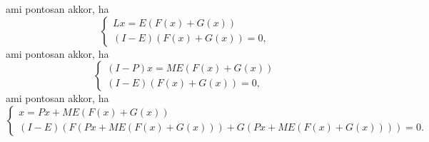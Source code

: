 \documentclass[oneside, titlepage, 12pt, a4paper]{report}
\begin{document}
ami pontosan akkor, ha
\begin{equation*}
\begin{cases}
Lx = E(F(x) + G(x)) \\
(I - E)(F(x) + G(x)) = 0,
\end{cases}
\end{equation*}
ami pontosan akkor, ha
\begin{equation*}
\begin{cases}
(I - P)x = ME(F(x) + G(x)) \\
(I - E)(F(x) + G(x)) = 0,
\end{cases}
\end{equation*}
ami pontosan akkor, ha
\begin{equation*}
\begin{cases}
x = Px + ME(F(x) + G(x)) \\
(I - E)(F(Px + ME(F(x) + G(x))) + G(Px + ME(F(x) + G(x)))) = 0.
\end{cases}
\end{equation*}


 

 
\end{document}
